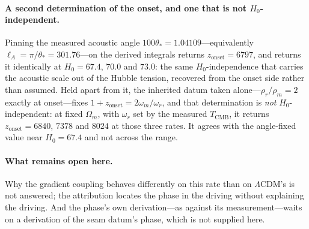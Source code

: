 \paragraph{A second determination of the onset, and one that is not $H_0$-independent.} Pinning
the measured acoustic angle $100\theta_*=1.04109$---equivalently $\ell_A=\pi/\theta_*=301.76$---on
the derived integrals returns $z_{\mathrm{onset}}=6797$, and returns it identically at $H_0=67.4$,
$70.0$ and $73.0$: the same $H_0$-independence that carries the acoustic scale out of the Hubble
tension, recovered from the onset side rather than
assumed. Held apart from it, the
inherited datum taken alone---$\rho_r/\rho_m=2$ exactly at onset---fixes
$1+z_{\mathrm{onset}}=2\omega_m/\omega_r$, and that determination is \emph{not} $H_0$-independent:
at fixed $\Omega_m$, with $\omega_r$ set by the measured $T_{\mathrm{CMB}}$, it returns
$z_{\mathrm{onset}}=6840$, $7378$ and $8024$ at those three rates. It agrees with the angle-fixed
value near $H_0=67.4$ and not across the range.

\paragraph{What remains open here.} Why the gradient coupling behaves differently on this rate
than on $\Lambda$CDM's is not answered; the attribution locates the phase in the driving without
explaining the driving. And the phase's own derivation---as against its measurement---waits on a
derivation of the seam datum's phase, which is not supplied here.
